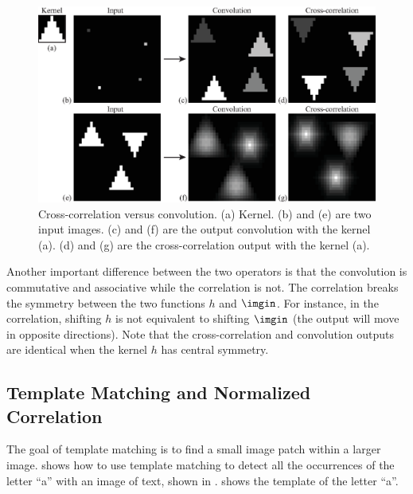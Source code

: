 \begin{figure}[t]
\centerline{
\includegraphics[width=1\linewidth]{figures/linear_image_filtering/correlation_vs_convolution.eps}
}
\caption{Cross-correlation versus convolution. (a) Kernel. (b) and (e) are two input images. (c) and (f) are the output convolution with the kernel (a). (d) and (g) are the cross-correlation output with the kernel (a).} 
\label{fig:corrvsconv}
\end{figure}


Another important difference between the two operators is that the convolution is commutative and associative while the correlation is not. The correlation breaks the symmetry between the two functions $h$ and $\imgin$. For instance, in the correlation, shifting $h$ is not equivalent to shifting $\imgin$ (the output will move in opposite directions). Note that the cross-correlation and convolution outputs are identical when the kernel $h$ has central symmetry.



\subsection{Template Matching and Normalized Correlation}




The goal of template matching is to find a small image patch within a larger image. 
\Fig{\ref{fig:normcorr}} shows how to use template matching to detect all the occurrences of the letter ``a'' with an image of text, shown in .  shows the template of the letter ``a''.



